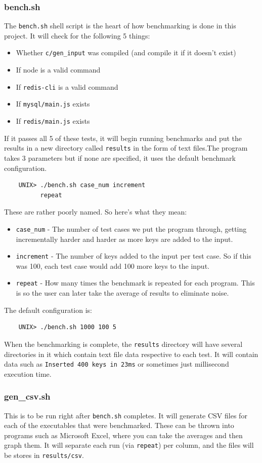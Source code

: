 \documentclass[letterpaper, 10 pt, conference]{ieeeconf}
\begin{document}
\subsubsection{bench.sh}
The \texttt{bench.sh} shell script is the heart of how benchmarking is done in this project. It will check for the following 5 things:
\begin{itemize}
    \item Whether  \texttt{c/gen\_input} was compiled (and compile it if it doesn't exist)
    \item If node is a valid command
    \item If \texttt{redis-cli} is a valid command
    \item If \texttt{mysql/main.js} exists
    \item If \texttt{redis/main.js} exists
\end{itemize}
If it passes all 5 of these tests, it will begin running benchmarks and put the results in a new directory called \texttt{results} in the form of text files.The program takes 3 parameters but if none are specified, it uses the default benchmark configuration.
\begin{verbatim}
    UNIX> ./bench.sh case_num increment 
          repeat
\end{verbatim}
These are rather poorly named. So here's what they mean:
\begin{itemize}
    \item \texttt{case\_num} - The number of test cases we put the program through, getting incrementally harder and harder as more keys are added to the input.
    \item \texttt{increment} - The number of keys added to the input per test case. So if this was 100, each test case would add 100 more keys to the input.
    \item \texttt{repeat} - How many times the benchmark is repeated for each program. This is so the user can later take the average of results to eliminate noise.
\end{itemize}
The default configuration is:
\begin{verbatim}
    UNIX> ./bench.sh 1000 100 5
\end{verbatim}
When the benchmarking is complete, the \texttt{results} directory will have several directories in it which contain text file data respective to each test. It will contain data such as \texttt{Inserted 400 keys in 23ms} or sometimes just millisecond execution time.\\
\subsubsection{gen\_csv.sh}
This is to be run right after \texttt{bench.sh} completes. It will generate CSV files for each of the executables that were benchmarked. These can be thrown into programs such as Microsoft Excel, where you can take the averages and then graph them. It will separate each run (via \texttt{repeat}) per column, and the files will be stores in \texttt{results/csv}.
\end{document}
